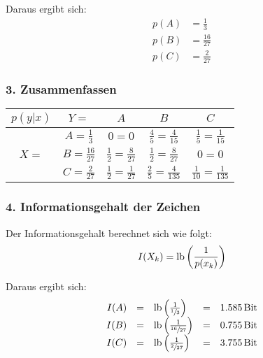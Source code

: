 Daraus ergibt sich:
\begin{align*}
	p(A) &= \frac{1}{3} \\
	p(B) &= \frac{16}{27} \\
	p(C) &= \frac{2}{27}
\end{align*}


\subsubsection*{3. Zusammenfassen}

\begin{tabular}[H]{|c|c|c|c|c|}
	\hline
	$p(y|x)$ & $Y=$ & $A$ & $B$ & $C$ \\
	\hline
	\multirow{3}{*}{$X=$} & $A = \frac{1}{3}$ & $0 = 0$ & $\frac{4}{5} = \frac{4}{15}$ & $\frac{1}{5} = \frac{1}{15}$ \\
	\cline{2-5}
	& $B = \frac{16}{27}$ & $\frac{1}{2} = \frac{8}{27}$ & $\frac{1}{2} = \frac{8}{27}$ & $0 = 0$ \\
	\cline{2-5}
	& $C = \frac{2}{27}$ & $\frac{1}{2} = \frac{1}{27}$ & $\frac{2}{5} = \frac{4}{135}$ & $\frac{1}{10} = \frac{1}{135}$ \\
	\hline
\end{tabular}


\subsubsection*{4. Informationsgehalt der Zeichen}

Der Informationsgehalt berechnet sich wie folgt:
\[
	I(X_k) = \operatorname{lb}\left(\frac{1}{p(x_k)}\right)
\]

Daraus ergibt sich:
{%
	\renewcommand{\arraystretch}{2}
	\begin{equation*}
		\begin{array}{rclcl}
			I(A) &=& \operatorname{lb}\left(\frac{1}{\sfrac{1}{3}}\right) &=& 1.585 \, \textrm{Bit} \\
			I(B) &=& \operatorname{lb}\left(\frac{1}{\sfrac{16}{27}}\right) &=& 0.755 \, \textrm{Bit} \\
			I(C) &=& \operatorname{lb}\left(\frac{1}{\sfrac{2}{27}}\right) &=& 3.755 \, \textrm{Bit}
		\end{array}
	\end{equation*}
}%
